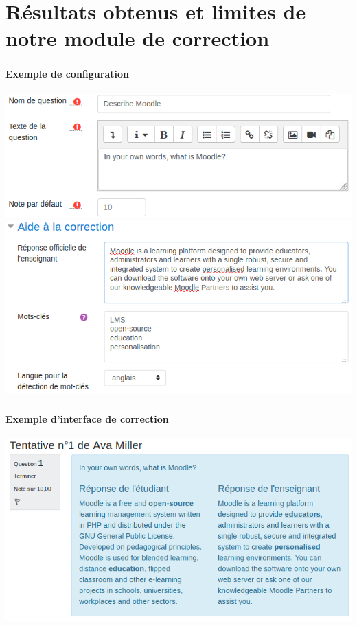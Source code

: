 \documentclass{beamer}
\begin{document}
  \section[R\'esultats]{R\'esultats obtenus et limites de notre module de correction}
  \begin{frame}
  \frametitle{\insertsection}
  \framesubtitle{Exemple de configuration}
  \begin{center}
    \includegraphics[scale=0.4]{../images/questionform_base.png}
    \includegraphics[scale=0.4]{../images/questionform_helper.png}
  \end{center}
  \end{frame}
  
  \begin{frame}
  \frametitle{\insertsection}
  \framesubtitle{Exemple d'interface de correction}
  \begin{center}
    \includegraphics[scale=0.4]{../images/questionform_correction.png}
  \end{center}
  \end{frame}
  
\end{document}
